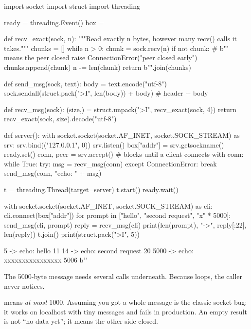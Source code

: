 \begin{pycode}
import socket
import struct
import threading

ready = threading.Event()
box = {}

def recv_exact(sock, n):
    """Read exactly n bytes, however many recv() calls it takes."""
    chunks = []
    while n > 0:
        chunk = sock.recv(n)
        if not chunk:                      # b"" means the peer closed
            raise ConnectionError("peer closed early")
        chunks.append(chunk)
        n -= len(chunk)
    return b"".join(chunks)

def send_msg(sock, text):
    body = text.encode("utf-8")
    sock.sendall(struct.pack(">I", len(body)) + body)  # header + body

def recv_msg(sock):
    (size,) = struct.unpack(">I", recv_exact(sock, 4))
    return recv_exact(sock, size).decode("utf-8")

def server():
    with socket.socket(socket.AF_INET, socket.SOCK_STREAM) as srv:
        srv.bind(("127.0.0.1", 0))
        srv.listen()
        box["addr"] = srv.getsockname()
        ready.set()
        conn, peer = srv.accept()          # blocks until a client connects
        with conn:
            while True:
                try:
                    msg = recv_msg(conn)
                except ConnectionError:
                    break
                send_msg(conn, "echo: " + msg)

t = threading.Thread(target=server)
t.start()
ready.wait()

with socket.socket(socket.AF_INET, socket.SOCK_STREAM) as cli:
    cli.connect(box["addr"])
    for prompt in ["hello", "second request", "x" * 5000]:
        send_msg(cli, prompt)
        reply = recv_msg(cli)
        print(len(prompt), "->", reply[:22], len(reply))
t.join()
print(struct.pack(">I", 5))
\end{pycode}
\begin{rawcode}
5 -> echo: hello 11
14 -> echo: second request 20
5000 -> echo: xxxxxxxxxxxxxxxx 5006
b''
\end{rawcode}

The 5000-byte message needs several  calls underneath. Because
 loops, the caller never notices.

\begin{trap}
 means \emph{at most} 1000. Assuming you got a whole message is the
classic socket bug: it works on localhost with tiny messages and fails in production.
An empty result  is not ``no data yet''; it means the other side closed.
\end{trap}

